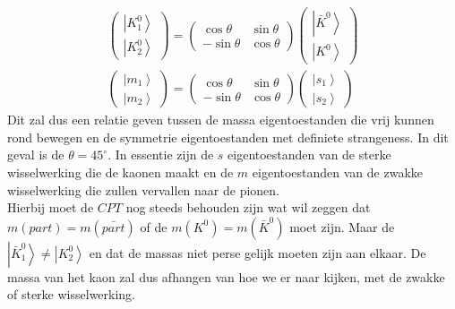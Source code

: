 \documentclass[../main.tex]{subfiles}
\begin{document}
\begin{equation}
    \begin{aligned}
        \label{eq:kaon_cp_eig_mat}
        \left(\begin{array}{c}
            \left| K_{1}^{0}\right> \\
            \left| K_{2}^{0}\right>
            \end{array}\right)=\left(\begin{array}{cc}
                \cos \theta & \sin \theta \\
                -\sin \theta & \cos \theta
            \end{array}\right)\left(\begin{array}{c}
            \left| \bar{K}^{0}\right> \\
            \left| K^{0}\right>
        \end{array}\right)\\
        \left(\begin{array}{c}
            \left| m_{1}\right> \\
            \left| m_{2}\right>
            \end{array}\right)=\left(\begin{array}{cc}
                \cos \theta & \sin \theta \\
                -\sin \theta & \cos \theta
            \end{array}\right)\left(\begin{array}{c}
            \left| s_{1}\right> \\
            \left| s_{2}\right>
        \end{array}\right)
    \end{aligned}
\end{equation}
Dit zal dus een relatie geven tussen de massa eigentoestanden die vrij kunnen rond bewegen en de symmetrie eigentoestanden met definiete strangeness. In dit geval is de $\theta=45^\circ$. In essentie zijn de $s$ eigentoestanden van de sterke wisselwerking die de kaonen maakt en de $m$ eigentoestanden van de zwakke wisselwerking die zullen vervallen naar de pionen.\\
Hierbij moet de $CPT$ nog steeds behouden zijn wat wil zeggen dat $m(part) = m(\bar{part})$ of de $m(K^0) = m(\bar{K}^0)$ moet zijn. Maar de $\left|\bar{K}_{1}^{0}\right>\neq\left| K_{2}^{0}\right>$ en dat de massas niet perse gelijk moeten zijn aan elkaar. De massa van het kaon zal dus afhangen van hoe we er naar kijken, met de zwakke of sterke wisselwerking.
\end{document}
